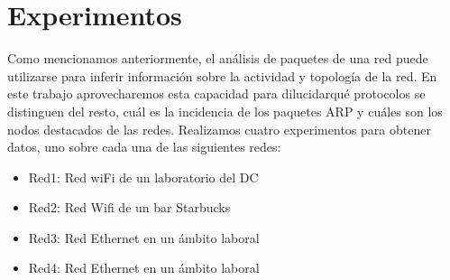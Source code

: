 \section{Experimentos}

Como mencionamos anteriormente, el análisis de paquetes de una red puede utilizarse para inferir información sobre la actividad y topología de la red. En este trabajo aprovecharemos esta capacidad para dilucidarqué protocolos se distinguen del resto, cuál es la incidencia de los paquetes ARP y cuáles son los nodos destacados de las redes.
Realizamos cuatro experimentos para obtener datos, uno sobre cada una de las siguientes redes:
\begin{itemize}
	\item Red1: Red wiFi de un laboratorio del DC
	\item Red2: Red Wifi de un bar Starbucks
	\item Red3: Red Ethernet en un ámbito laboral
	\item Red4: Red Ethernet en un ámbito laboral
\end{itemize}


